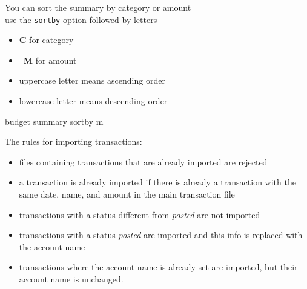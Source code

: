 \documentclass[12pt,letterpaper]{article}
\begin{document}
\begin{framed}
    \begin{minipage}[t][3in][t]{5in}
        \Large
        You can sort the summary by category or amount\\

        use the \lstinline[language=budget,basicstyle=\Large]!sortby! option followed by letters
        \begin{itemize}
            \item \textbf{C} for category
            \item \textbf{M} for amount
            \item uppercase letter means ascending order
            \item lowercase letter means descending order
        \end{itemize}
        \begin{budget}
            budget summary sortby m
        \end{budget}
    \end{minipage}
\end{framed}
\begin{framed}
    \begin{minipage}[t][3in][t]{5in}
        \Large
        The rules for importing transactions:\\
        \normalsize
        \begin{minipage}[t]{4in}
            \begin{itemize}
                \item files containing transactions that are already imported are rejected
                \item a transaction is already imported if there is already a transaction with the same date, name, and amount in the main transaction file 
                \item transactions with a status different from \emph{posted} are not imported 
                \item transactions with a status \emph{posted} are imported and this info is replaced with the account name
                \item transactions where the account name is already set are imported, but their account name is unchanged.
            \end{itemize}
        \end{minipage}

    \end{minipage}
\end{framed}
\end{document}
